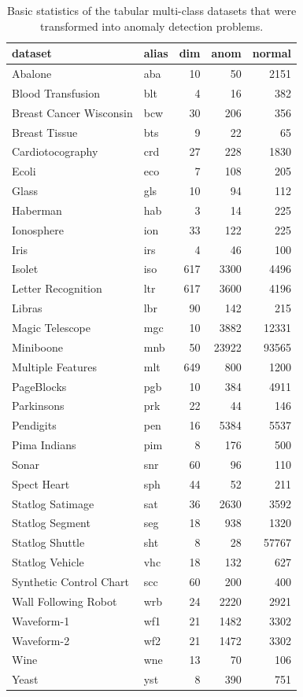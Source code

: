 \begin{table}
    \centering
    \tabcolsep=0.1cm
    \begin{tabular}{llrrr}
    \toprule
    \textbf{dataset} & \textbf{alias} & \textbf{dim} & \textbf{anom} & \textbf{normal}   \\\midrule
    Abalone & aba & 10 & 50 & 2151  \\
    Blood Transfusion & blt & 4 & 16 & 382  \\
    Breast Cancer Wisconsin & bcw  & 30 & 206 & 356 \\
    Breast Tissue & bts & 9 & 22 & 65 \\
    Cardiotocography & crd & 27 & 228 & 1830  \\
    Ecoli & eco & 7 & 108 & 205  \\
    Glass & gls & 10 & 94 & 112  \\
    Haberman & hab & 3 & 14 & 225  \\
    Ionosphere & ion & 33 & 122 & 225  \\
    Iris & irs & 4 & 46 & 100  \\
    Isolet & iso & 617 & 3300 & 4496  \\
    Letter Recognition & ltr & 617 & 3600 & 4196  \\
    Libras & lbr & 90 & 142 & 215  \\
    Magic Telescope & mgc & 10 & 3882 & 12331  \\
    Miniboone & mnb & 50 & 23922 & 93565  \\
    Multiple Features & mlt & 649 & 800 & 1200  \\
    PageBlocks & pgb & 10 & 384 & 4911  \\
    Parkinsons & prk & 22 & 44 & 146  \\
    Pendigits & pen & 16 & 5384 & 5537  \\
    Pima Indians & pim & 8 & 176 & 500  \\
    Sonar & snr & 60 & 96 & 110  \\
    Spect Heart & sph & 44 & 52 & 211  \\
    Statlog Satimage & sat & 36 & 2630 & 3592  \\
    Statlog Segment & seg & 18 & 938 & 1320  \\
    Statlog Shuttle & sht & 8 & 28 & 57767  \\
    Statlog Vehicle & vhc & 18 & 132 & 627  \\
    Synthetic Control Chart & scc & 60 & 200 & 400  \\
    Wall Following Robot & wrb & 24 & 2220 & 2921  \\
    Waveform-1 & wf1 & 21 & 1482 & 3302  \\
    Waveform-2 & wf2 & 21 & 1472 & 3302  \\
    Wine & wne & 13 & 70 & 106  \\
    Yeast & yst & 8 & 390 & 751   \\\bottomrule
    \end{tabular}
    \vspace*{0.15cm}
    \caption{Basic statistics of the tabular multi-class datasets that were transformed into anomaly detection problems.}
    \label{tab:tabular_datasets_classification}
\end{table}

